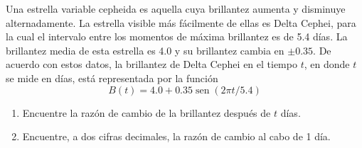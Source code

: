 \item Una estrella variable cepheida es aquella cuya brillantez aumenta y disminuye alternadamente. La estrella visible más fácilmente de ellas es Delta Cephei, para la cual el intervalo entre los momentos de máxima brillantez es de 5.4 días. La brillantez media de esta estrella es 4.0 y su brillantez cambia en $\pm 0.35$. De acuerdo con estos datos, la brillantez de Delta Cephei en el tiempo $t$, en donde $t$ se mide en días, está representada por la función
$$B(t) = 4.0 + 0.35 \operatorname{sen}(2\pi t / 5.4)$$
\begin{enumerate}
    \item[(a)] Encuentre la razón de cambio de la brillantez después de $t$ días.
    \item[(b)] Encuentre, a dos cifras decimales, la razón de cambio al cabo de 1 día.
\end{enumerate}
